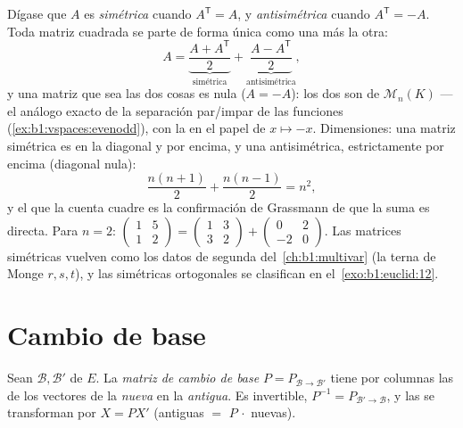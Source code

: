 \begin{example}
\label{ex:b1:matrices:symsplit}
Dígase que $A$ es \emph{simétrica} cuando $A^{\mathsf T} = A$, y
\emph{antisimétrica} cuando $A^{\mathsf T} = -A$. Toda matriz
cuadrada se parte de forma única como una más la otra:
\[
A = \underbrace{\frac{A + A^{\mathsf T}}{2}}_{\text{simétrica}}
+ \underbrace{\frac{A - A^{\mathsf T}}{2}}_{\text{antisimétrica}},
\]
y una matriz que sea las dos cosas es nula ($A = -A$): los dos
 son  de $\mathcal{M}_n(K)$ ---
el análogo exacto de la separación par/impar de las funciones
(\cref{ex:b1:vspaces:evenodd}), con la  en el papel de
$x \mapsto -x$. Dimensiones: una matriz simétrica es  en la
diagonal y por encima, y una antisimétrica, estrictamente por encima
(diagonal nula):
\[
\frac{n(n+1)}{2} + \frac{n(n-1)}{2} = n^2 ,
\]
y el que la cuenta cuadre es la confirmación de Grassmann de que la
suma es directa. Para $n = 2$:
$\begin{pmatrix} 1 & 5\\ 1 & 2\end{pmatrix} = \begin{pmatrix} 1 & 3\\
3 & 2\end{pmatrix} + \begin{pmatrix} 0 & 2\\ -2 & 0\end{pmatrix}$.
Las matrices simétricas vuelven como los datos de segunda 
del~\cref{ch:b1:multivar} (la terna de Monge $r, s, t$), y las
simétricas ortogonales se clasifican en el~\cref{exo:b1:euclid:12}.
\end{example}

\section{Cambio de base}

\begin{definition}\label{def:b1:matrices:changeofbasis}
Sean $\mathcal{B}, \mathcal{B}'$  de $E$. La \emph{matriz de
cambio de base}
$P = P_{\mathcal{B}\to\mathcal{B}'}$ tiene por columnas las
 de los vectores de la  \emph{nueva} en la 
\emph{antigua}. Es invertible, $P^{-1} =
P_{\mathcal{B}'\to\mathcal{B}}$, y las  se transforman por
$X = PX'$ (antiguas $=$ $P\,\cdot$ nuevas).
\end{definition}

